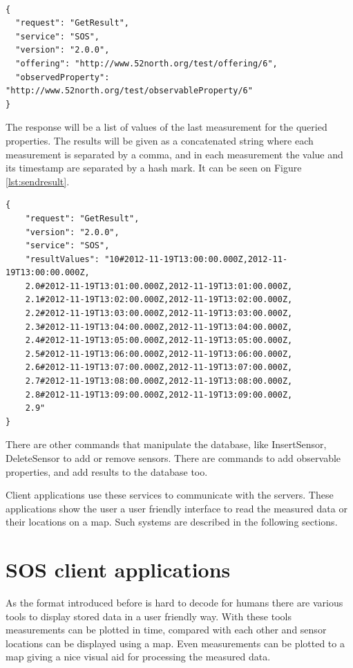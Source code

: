 \begin{lstlisting}[caption={JSON minimal GetResult POST request\label{lst:getresult}}]

{
  "request": "GetResult",
  "service": "SOS",
  "version": "2.0.0",
  "offering": "http://www.52north.org/test/offering/6",
  "observedProperty": "http://www.52north.org/test/observableProperty/6"
}
\end{lstlisting}

The response will be a list of values of the last measurement for the queried properties. The results will be given as a concatenated string where each measurement is separated by a comma, and in each measurement the value and its timestamp are separated by a hash mark. It can be seen on Figure \ref{lst:sendresult}.

\begin{lstlisting}[caption={JSON GetResult response\label{lst:sendresult}}]
{
    "request": "GetResult",
    "version": "2.0.0",
    "service": "SOS",
    "resultValues": "10#2012-11-19T13:00:00.000Z,2012-11-19T13:00:00.000Z,
    2.0#2012-11-19T13:01:00.000Z,2012-11-19T13:01:00.000Z,
    2.1#2012-11-19T13:02:00.000Z,2012-11-19T13:02:00.000Z,
    2.2#2012-11-19T13:03:00.000Z,2012-11-19T13:03:00.000Z,
    2.3#2012-11-19T13:04:00.000Z,2012-11-19T13:04:00.000Z,
    2.4#2012-11-19T13:05:00.000Z,2012-11-19T13:05:00.000Z,
    2.5#2012-11-19T13:06:00.000Z,2012-11-19T13:06:00.000Z,
    2.6#2012-11-19T13:07:00.000Z,2012-11-19T13:07:00.000Z,
    2.7#2012-11-19T13:08:00.000Z,2012-11-19T13:08:00.000Z,
    2.8#2012-11-19T13:09:00.000Z,2012-11-19T13:09:00.000Z,
    2.9"
}
\end{lstlisting}

There are other commands that manipulate the database, like InsertSensor, DeleteSensor to add or remove sensors. There are commands to add observable properties, and add results to the database too. 

Client applications use these services to communicate with the servers. These applications show the user a user friendly interface to read the measured data or their locations on a map. Such systems are described in the following sections.

\section{SOS client applications}

As the format introduced before is hard to decode for humans there are various tools to display stored data in a user friendly way. With these tools measurements can be plotted in time, compared with each other and sensor locations can be displayed using a map. Even measurements can be plotted to a map giving a nice visual aid for processing the measured data. 

